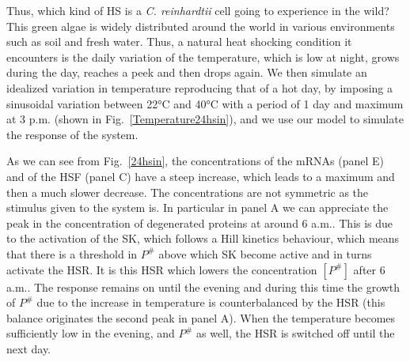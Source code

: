 \documentclass[oneside, 10pt, a4paper, twocolumn]{article}
\begin{document}
Thus, which kind of HS is a \emph{C. reinhardtii} cell going to experience in the wild? %
This green algae is widely distributed around the world in various environments such as soil and fresh water. 
Thus, a natural heat shocking condition it encounters is the daily variation of the temperature, which is low at night, grows during the day, reaches a peek and then drops again.
We then simulate an idealized variation in temperature reproducing that of a hot day, by imposing a sinusoidal variation between 22°C and 40°C with a period of 1 day and maximum at 3 p.m. (shown in Fig.~\ref{Temperature24hsin}), and we use our model to simulate the response of the system.

As we can see from Fig.~\ref{24hsin}, the concentrations of the mRNAs (panel E) and of the HSF (panel C) have a steep increase, which leads to a maximum and then a much slower decrease. The concentrations are not symmetric as the stimulus given to the system is. 
In particular in panel A we can appreciate the peak in the concentration of degenerated proteins at around 6 a.m.. This is due to the activation of the SK, which follows a Hill kinetics behaviour, which means that there is a threshold in $P^\#$ above which SK become active and in turns activate the HSR. It is this HSR which lowers the concentration $\left[P^\#\right]$ after 6 a.m.. The response remains on until the evening and during this time the growth of $P^\#$  due to the increase in temperature is counterbalanced by the HSR (this balance originates the second peak in panel A). When the temperature becomes sufficiently low in the evening, and $P^\#$  as well, the HSR is switched off until the next day. 
\end{document}
